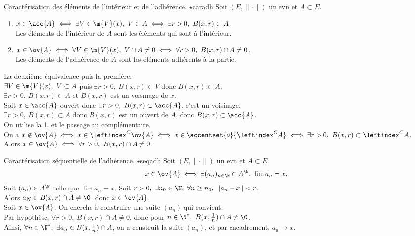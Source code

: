 \documentclass[11pt]{article}
\begin{document}
\pagebreak

\begin{thm}{Caractérisation des éléments de l'intérieur et de l'adhérence. $\star$}{caradh}
    Soit $(E,\|\cdot\|)$ un evn et $A\subset E$.
    \begin{enumerate}
        \item $x\in{\acc{A}} \iff \exists V \in \m{V}(x), ~ V \subset A \iff \exists r>0, ~ B(x,r)\subset A$.\\
        Les éléments de l'intérieur de $A$ sont les éléments qui sont à l'intérieur.
        \item $x\in\ov{A}\iff \forall V \in \m{V}(x), ~ V \cap A \neq 0 \iff \forall r > 0, ~ B(x,r)\cap A \neq 0$.\\
        Les éléments de l'adhérence de $A$ sont les éléments adhérents à la partie.
    \end{enumerate}
    \tcblower
     La deuxième équivalence puis la première:\\
    \boxed{\ra} $\exists V \in \m{V}(x), ~ V\subset A$ puis $\exists r > 0, ~ B(x,r)\subset V$ donc $B(x,r)\subset A$.\\
    \boxed{\la} $\exists r > 0, ~ B(x,r)\subset A$ et $B(x,r)$ est un voisinage de $x$.\\
    \boxed{\ra} Soit $x\in{\acc{A}}$ ouvert donc $\exists r>0, ~ B(x,r)\subset {\acc{A}}$, c'est un voisinage.\\
    \boxed{\la} $\exists r > 0, ~ B(x,r)\subset A$ donc $B(x,r)$ est un ouvert de $A$, donc $B(x,r)\subset{\acc{A}}$.\\
     On utilise la 1. et le passage au complémentaire.\\
    On a $x\notin\ov{A}\iff x\in\leftindex^C{\ov{A}}\iff x \in \accentset{\circ}{\leftindex^CA}\iff \exists r>0, ~ B(x,r)\subset\leftindex^CA$.\\
    Alors $x\in \ov{A} \iff \forall r > 0, ~ B(x,r) \cap A \neq 0$.
\end{thm}

\begin{thm}{Caractérisation séquentielle de l'adhérence. $\star$}{seqadh}
    Soit $(E,\|\cdot\|)$ un evn et $A\subset E$.
    \begin{equation*}
        x \in \ov{A} \iff \exists (a_n)_{n\in\N} \in A^\N, ~ \lim a_n = x.
    \end{equation*}
    \tcblower
    \boxed{\la} Soit $(a_n)\in A^\N$ telle que $\lim a_n = x$. Soit $r>0, ~ \exists n_0 \in \N, ~ \forall n \geq n_0, ~ \|a_n-x\| < r$.\\
    Alors $a_N\in B(x,r)\cap A\neq\0$, donc $x\in\ov{A}$.\\
    \boxed{\ra} Soit $x\in\ov{A}$. On cherche à construire une suite $(a_n)$ qui convient.\\
    Par hypothèse, $\forall r > 0, ~ B(x,r)\cap A \neq 0$, donc pour $n\in\N^*, ~ B(x,\frac{1}{n})\cap A\neq\0$.\\
    Ainsi, $\forall n \in \N^*, ~ \exists a_n \in B(x,\frac{1}{n})\cap A$, on a construit la suite $(a_n)$, et par encadrement, $a_n\to x$.
\end{thm}
\end{document}
